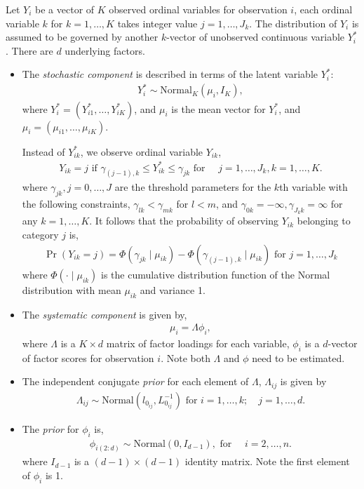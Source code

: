 Let $Y_i$ be a vector of $K$ observed ordinal variables for
observation $i$, each ordinal variable $k$ for $k=1,\ldots, K$ takes
integer value $j=1, \ldots, J_k$. The distribution of $Y_i$ is assumed
to be governed by another $k$-vector of unobserved continuous variable
$Y_i^*$. There are $d$ underlying factors.

\begin{itemize}
\item The \emph{stochastic component} is described in terms of the latent
variable $Y_i^*$:
\begin{eqnarray*}
Y_{i}^*  \sim \textrm{Normal}_K(\mu_i, I_K),
\end{eqnarray*}
where $Y_i^*=(Y_{i1}^*, \ldots, Y_{iK}^*)$, and $\mu_i$ is the mean vector
for $Y_i^*$, and $\mu_i=(\mu_{i1},\ldots, \mu_{iK})$.

Instead of $Y_{ik}^*$, we observe ordinal  variable $Y_{ik}$,
\begin{eqnarray*}
Y_{ik} = j \textrm{ if } \gamma_{(j-1),k} \le Y_{ik}^* \le \gamma_{jk}
\textrm{ for } \quad j=1,\ldots, J_k, k=1,\ldots, K.
\end{eqnarray*}
where $\gamma_{jk}, j=0,\ldots, J$ are the threshold parameters for
the $k$th variable with the following constraints, $\gamma_{lk} <
\gamma_{mk}$ for $l < m$, and $\gamma_{0k}=-\infty, \gamma_{J_k
k}=\infty$ for any $k=1, \ldots, K$.  It follows that the probability
of observing $Y_{ik}$ belonging to category $j$ is,
\begin{eqnarray*}
\Pr(Y_{ik}=j) =\Phi(\gamma_{jk} \mid \mu_{ik})-\Phi(\gamma_{(j-1),k} \mid \mu_{ik}) \textrm{ for } j=1,\ldots,J_k
\end{eqnarray*}
where $\Phi(\cdot \mid\mu_{ik})$ is the cumulative distribution
function of the Normal distribution with mean $\mu_{ik}$ and variance
1.

\item The \emph{systematic component} is given by,
\begin{eqnarray*}
\mu_i = \Lambda\phi_i,
\end{eqnarray*}
where $\Lambda$ is a $K \times d$ matrix of factor loadings for each
variable, $\phi_i$ is a $d$-vector of factor scores for observation
$i$. Note both $\Lambda$ and $\phi$ need to be estimated.

\item The independent conjugate \emph{prior} for each element of $\Lambda$,
$\Lambda_{ij}$ is given by
\begin{eqnarray*}
\Lambda_{ij} \sim \textrm{Normal}(l_{0_{ij}}, L_{0_{ij}}^{-1})
\textrm{ for } i=1,\ldots, k; \quad j=1,\ldots, d.
\end{eqnarray*}

\item The \emph{prior} for $\phi_i$ is,
\begin{eqnarray*}
\phi_{i(2:d)} \sim \textrm{Normal}(0, I_{d-1}), \textrm{ for } \quad i=2, \ldots, n.
\end{eqnarray*}
where $I_{d-1}$ is a $ (d-1)\times (d-1) $ identity matrix. Note the
first element of $\phi_i$ is 1.

\end{itemize}

